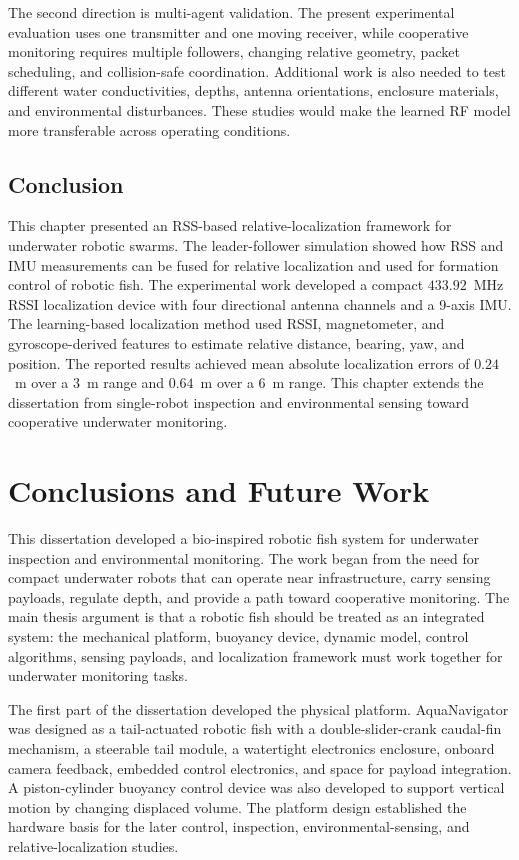 \documentclass{uhcoethesis}
\begin{document}
The second direction is multi-agent validation. The present experimental evaluation uses one transmitter and one moving receiver, while cooperative monitoring requires multiple followers, changing relative geometry, packet scheduling, and collision-safe coordination. Additional work is also needed to test different water conductivities, depths, antenna orientations, enclosure materials, and environmental disturbances. These studies would make the learned RF model more transferable across operating conditions.

\section{Conclusion}

This chapter presented an RSS-based relative-localization framework for underwater robotic swarms. The leader-follower simulation showed how RSS and IMU measurements can be fused for relative localization and used for formation control of robotic fish. The experimental work developed a compact $433.92$~MHz RSSI localization device with four directional antenna channels and a 9-axis IMU. The learning-based localization method used RSSI, magnetometer, and gyroscope-derived features to estimate relative distance, bearing, yaw, and position. The reported results achieved mean absolute localization errors of $0.24$~m over a 3~m range and $0.64$~m over a 6~m range. This chapter extends the dissertation from single-robot inspection and environmental sensing toward cooperative underwater monitoring.

\chapter{Conclusions and Future Work}

This dissertation developed a bio-inspired robotic fish system for underwater inspection and environmental monitoring. The work began from the need for compact underwater robots that can operate near infrastructure, carry sensing payloads, regulate depth, and provide a path toward cooperative monitoring. The main thesis argument is that a robotic fish should be treated as an integrated system: the mechanical platform, buoyancy device, dynamic model, control algorithms, sensing payloads, and localization framework must work together for underwater monitoring tasks.

The first part of the dissertation developed the physical platform. AquaNavigator was designed as a tail-actuated robotic fish with a double-slider-crank caudal-fin mechanism, a steerable tail module, a watertight electronics enclosure, onboard camera feedback, embedded control electronics, and space for payload integration. A piston-cylinder buoyancy control device was also developed to support vertical motion by changing displaced volume. The platform design established the hardware basis for the later control, inspection, environmental-sensing, and relative-localization studies.
\end{document}
